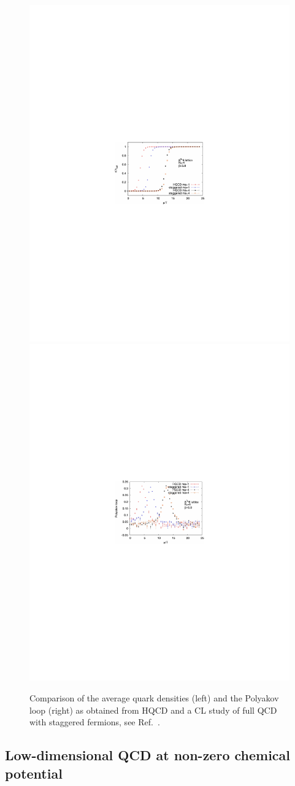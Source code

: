 \documentclass[../main.tex]{subfiles}
\begin{document}
%
\begin{figure}[t]
  \centering
  \includegraphics[width=0.49\columnwidth]{./4applications-REL/DensityQCDFiniteMuSexty.pdf}
  \includegraphics[width=0.49\columnwidth]{./4applications-REL/PolyakovQCDFiniteMuSexty.pdf}
  \caption{\label{fig:SextyPlots} Comparison of the average quark densities (left) and the Polyakov loop (right) as obtained from HQCD and a CL
  study of full QCD with staggered fermions, see Ref.~\cite{Sexty:2013ica}.}
\end{figure}

\subsection{Low-dimensional QCD at non-zero chemical potential}
\end{document}

